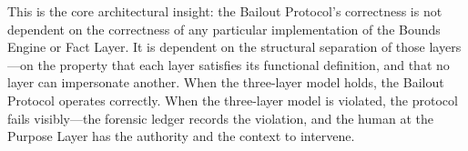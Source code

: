 This is the core architectural insight: the Bailout Protocol's correctness is not dependent on the correctness of any particular implementation of the Bounds Engine or Fact Layer. It is dependent on the structural separation of those layers---on the property that each layer satisfies its functional definition, and that no layer can impersonate another. When the three-layer model holds, the Bailout Protocol operates correctly. When the three-layer model is violated, the protocol fails visibly---the forensic ledger records the violation, and the human at the Purpose Layer has the authority and the context to intervene.
